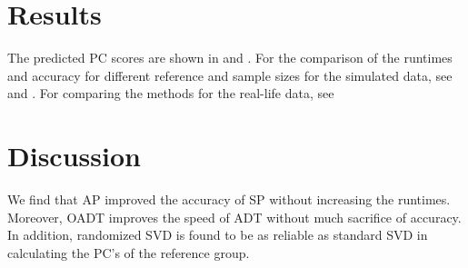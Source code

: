 \documentclass{article}
\begin{document}
\section{Results}

The predicted PC scores are shown in  and .
For the comparison of the runtimes and accuracy for different reference and sample sizes for the simulated data,
see  and .
For comparing the methods for the real-life data, see



\section{Discussion}

We find that AP improved the accuracy of SP without increasing the runtimes.
Moreover, OADT improves the speed of ADT without much sacrifice of accuracy.
In addition, randomized SVD is found to be as reliable as standard SVD in
calculating the PC's of the reference group.

\newpage
\end{document}
